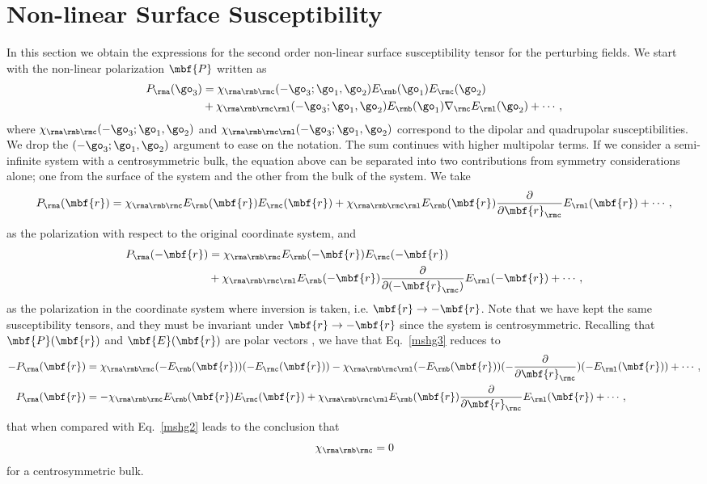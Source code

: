 \documentclass[floatfix,prb,aps,superscriptaddress,11pt,preprint,letterpaper]{revtex4}
\begin{document}
\section{Non-linear Surface Susceptibility}\label{nonchi}

In this section we obtain the expressions for the second order non-linear
surface susceptibility tensor for the perturbing fields.
We start with the 
non-linear polarization $\mbf{P}$ written as
\begin{align}\label{mshg}
P_{\rma}(\go_3)&=\chi_{\rma\rmb\rmc}(-\go_3;\go_1,\go_2)
E_{\rmb}(\go_1)
E_{\rmc}(\go_2)
\nonumber \\
&+
\chi_{\rma\rmb\rmc\rml}(-\go_3;\go_1,\go_2)
E_{\rmb}(\go_1)\nabla_{\rmc} E_{\rml}(\go_2)
+\cdots,
\end{align}
where $\chi_{\rma\rmb\rmc}(-\go_3;\go_1,\go_2)$ and 
$\chi_{\rma\rmb\rmc\rml}(-\go_3;\go_1,\go_2)$
correspond to the dipolar and quadrupolar susceptibilities.
We drop  the $(-\go_3;\go_1,\go_2)$ argument to ease on the notation.
The sum continues with higher multipolar terms.
If we consider a semi-infinite system with a centrosymmetric bulk, the
equation above can be separated into two contributions from symmetry 
considerations alone; one from the surface of the system and the other from
the bulk of the system. We take
\begin{equation}\label{mshg2}
P_{\rma}(\mbf{r})=\chi_{\rma\rmb\rmc}E_{\rmb}(\mbf{r})E_{\rmc}(\mbf{r})
+
\chi_{\rma\rmb\rmc\rml}E_{\rmb}(\mbf{r})\frac{\partial}{\partial
  \mbf{r}_{\rmc}} E_{\rml}(\mbf{r}) 
+\cdots,
\end{equation}
as the polarization with respect to the original coordinate system, and 
\begin{align}\label{mshg3}
P_{\rma}(-\mbf{r})&=\chi_{\rma\rmb\rmc}E_{\rmb}(-\mbf{r})E_{\rmc}(-\mbf{r})
\nonumber \\
&+
\chi_{\rma\rmb\rmc\rml}E_{\rmb}(-\mbf{r})\frac{\partial}{\partial(-
  \mbf{r}_{\rmc})} E_{\rml}(-\mbf{r}) 
+\cdots, 
\end{align}
as the polarization in the coordinate system where inversion is taken,
i.e. $\mbf{r} \to -\mbf{r}$. 
Note that we have kept the same susceptibility tensors, and they must be 
invariant under $\mbf{r} \to -\mbf{r}$ since the system is centrosymmetric.
Recalling that $\mbf{P}(\mbf{r})$ and $\mbf{E}(\mbf{r})$ are polar vectors 
\cite{jackson_classical_1975}, we have that Eq.~\eqref{mshg3} reduces to
\begin{align}\label{mshg4}
-P_{\rma}(\mbf{r})&=\chi_{\rma\rmb\rmc}(-E_{\rmb}(\mbf{r}))(-E_{\rmc}(\mbf{r}))
-
\chi_{\rma\rmb\rmc\rml}(-E_{\rmb}(\mbf{r}))(-\frac{\partial}{\partial\mbf{r}_{\rmc}})(-
E_{\rml}(\mbf{r})) 
+\cdots,
\nonumber \\
P_{\rma}(\mbf{r})&=-\chi_{\rma\rmb\rmc}E_{\rmb}(\mbf{r})E_{\rmc}(\mbf{r})
+
\chi_{\rma\rmb\rmc\rml}E_{\rmb}(\mbf{r})\frac{\partial}{\partial\mbf{r}_{\rmc}}
E_{\rml}(\mbf{r}) 
+\cdots,
\end{align}
that when compared with Eq.~\eqref{mshg2} leads to the conclusion that
\begin{equation}\label{sshg}
\chi_{\rma\rmb\rmc}=0
\end{equation}
for a centrosymmetric bulk.
\end{document}
